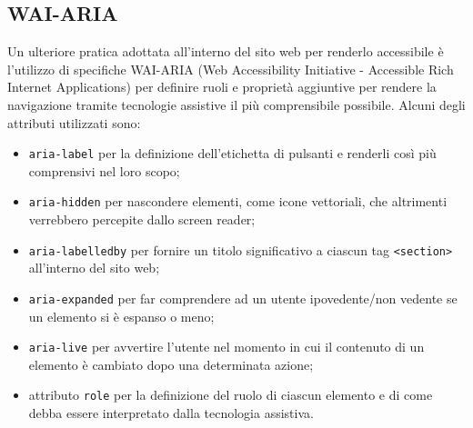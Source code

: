 \documentclass[a4paper,10pt]{article}
\begin{document}
	\subsection{WAI-ARIA}
	Un ulteriore pratica adottata all'interno del sito web per renderlo accessibile è l'utilizzo di specifiche WAI-ARIA (Web Accessibility Initiative - Accessible Rich Internet Applications) per definire ruoli e proprietà aggiuntive per rendere la navigazione tramite tecnologie assistive il più comprensibile possibile. Alcuni degli attributi utilizzati sono:
	\begin{itemize}
		\item \texttt{aria-label} per la definizione dell'etichetta di pulsanti e renderli così più comprensivi nel loro scopo;
		\item \texttt{aria-hidden} per nascondere elementi, come icone vettoriali, che altrimenti verrebbero percepite dallo screen reader;
		\item \texttt{aria-labelledby} per fornire un titolo significativo a ciascun tag \texttt{<section>} all'interno del sito web;
		\item \texttt{aria-expanded} per far comprendere ad un utente ipovedente/non vedente se un elemento si è espanso o meno;
		\item \texttt{aria-live} per avvertire l'utente nel momento in cui il contenuto di un elemento è cambiato dopo una determinata azione;
		\item attributo \texttt{role} per la definizione del ruolo di ciascun elemento e di come debba essere interpretato dalla tecnologia assistiva.
	\end{itemize}
\end{document}
